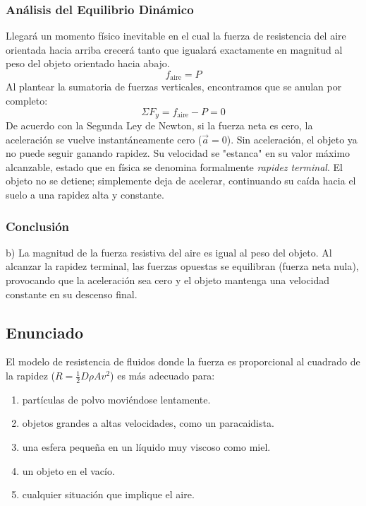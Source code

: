 \documentclass[12pt]{article}
\begin{document}
\subsubsection*{Análisis del Equilibrio Dinámico}
Llegará un momento físico inevitable en el cual la fuerza de resistencia del aire orientada hacia arriba crecerá tanto que igualará exactamente en magnitud al peso del objeto orientado hacia abajo.
\begin{equation}
    f_{\text{aire}} = P
\end{equation}
Al plantear la sumatoria de fuerzas verticales, encontramos que se anulan por completo:
\begin{equation}
    \Sigma F_y = f_{\text{aire}} - P = 0
\end{equation}
De acuerdo con la Segunda Ley de Newton, si la fuerza neta es cero, la aceleración se vuelve instantáneamente cero ($\vec{a} = 0$). Sin aceleración, el objeto ya no puede seguir ganando rapidez. Su velocidad se "estanca" en su valor máximo alcanzable, estado que en física se denomina formalmente \textit{rapidez terminal}. El objeto no se detiene; simplemente deja de acelerar, continuando su caída hacia el suelo a una rapidez alta y constante.

\subsubsection*{Conclusión}
b) La magnitud de la fuerza resistiva del aire es igual al peso del objeto. Al alcanzar la rapidez terminal, las fuerzas opuestas se equilibran (fuerza neta nula), provocando que la aceleración sea cero y el objeto mantenga una velocidad constante en su descenso final.

\newpage

\subsection*{Enunciado}
El modelo de resistencia de fluidos donde la fuerza es proporcional al cuadrado de la rapidez ($R = \frac{1}{2}D\rho Av^2$) es más adecuado para:
\begin{enumerate}
    \item[a)] partículas de polvo moviéndose lentamente.
    \item[b)] objetos grandes a altas velocidades, como un paracaidista.
    \item[c)] una esfera pequeña en un líquido muy viscoso como miel.
    \item[d)] un objeto en el vacío.
    \item[e)] cualquier situación que implique el aire.
\end{enumerate}
\end{document}

